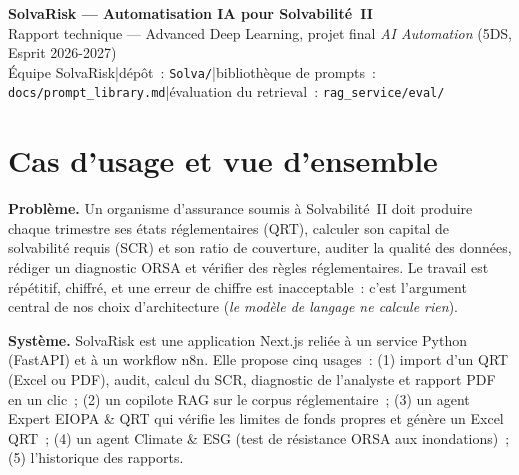 \documentclass[11pt,a4paper]{article}
\newcommand{\code}[1]{\texttt{\small #1}}
\begin{document}
\begin{center}
{\LARGE\bfseries\color{acc} SolvaRisk --- Automatisation IA pour Solvabilit\'e~II}\\[3pt]
{\large Rapport technique --- Advanced Deep Learning, projet final \emph{AI Automation} (5DS, Esprit 2026-2027)}\\[2pt]
\small \'Equipe SolvaRisk\quad|\quad d\'epôt~: \code{Solva/}\quad|\quad biblioth\`eque de prompts~: \code{docs/prompt\_library.md}\quad|\quad \'evaluation du retrieval~: \code{rag\_service/eval/}
\end{center}

\section{Cas d'usage et vue d'ensemble}
\textbf{Probl\`eme.} Un organisme d'assurance soumis \`a Solvabilit\'e~II doit produire chaque trimestre ses \'etats r\'eglementaires (QRT), calculer son capital de solvabilit\'e requis (SCR) et son ratio de couverture, auditer la qualit\'e des donn\'ees, r\'ediger un diagnostic ORSA et v\'erifier des r\`egles r\'eglementaires. Le travail est r\'ep\'etitif, chiffr\'e, et une erreur de chiffre est inacceptable~: c'est l'argument central de nos choix d'architecture (\emph{le mod\`ele de langage ne calcule rien}).

\textbf{Syst\`eme.} SolvaRisk est une application Next.js reli\'ee \`a un service Python (FastAPI) et \`a un workflow n8n. Elle propose cinq usages~: (1) import d'un QRT (Excel ou PDF), audit, calcul du SCR, diagnostic de l'analyste et rapport PDF en un clic~; (2) un copilote RAG sur le corpus r\'eglementaire~; (3) un agent \og Expert EIOPA \& QRT\fg{} qui v\'erifie les limites de fonds propres et g\'en\`ere un Excel QRT~; (4) un agent \og Climate \& ESG\fg{} (test de r\'esistance ORSA aux inondations)~; (5) l'historique des rapports.
\end{document}
